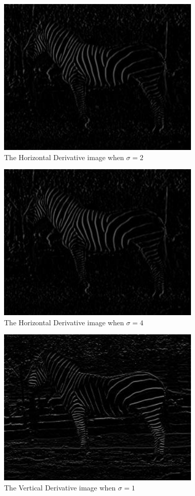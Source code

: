 \documentclass[11pt,psfig]{article}
\begin{document}
\begin{figure}[H]
\centering
\includegraphics[height=3in]{sigma_2_horizDeriv_zebra_small.jpg}
\caption{The Horizontal Derivative image when $\sigma=2$}
\end{figure}

\begin{figure}[H]
\centering
\includegraphics[height=3in]{sigma_4_horizDeriv_zebra_small.jpg}
\caption{The Horizontal Derivative image when $\sigma=4$}
\end{figure}

\begin{figure}[H]
\centering
\includegraphics[height=3in]{sigma_1_vertDeriv_zebra_small.jpg}
\caption{The Vertical Derivative image when $\sigma=1$}
\end{figure}
\end{document}
